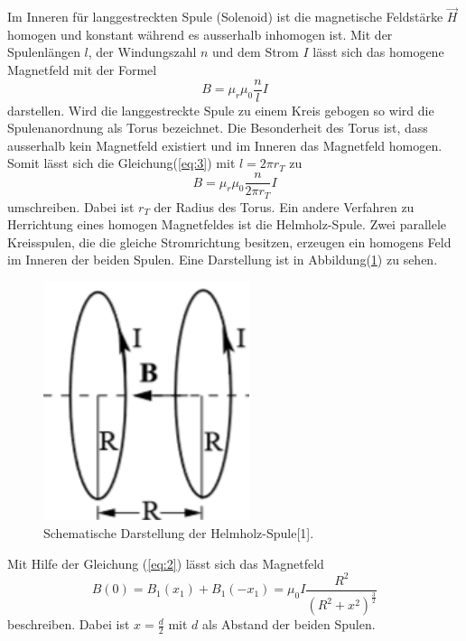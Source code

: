 Im Inneren für langgestreckten Spule (Solenoid) ist die magnetische Feldstärke $\vec{H}$
homogen und konstant während es ausserhalb inhomogen ist.
Mit der Spulenlängen $l$, der Windungszahl $n$ und dem Strom $I$ lässt sich das
homogene Magnetfeld mit der Formel
\begin{equation}
  B = \mu_r \mu_0 \frac{n}{l} I
  \label{eq:3}
\end{equation}
darstellen. Wird die langgestreckte Spule zu einem Kreis gebogen so wird die Spulenanordnung
als Torus bezeichnet. Die Besonderheit des Torus ist, dass ausserhalb kein Magnetfeld
existiert und im Inneren das Magnetfeld homogen. Somit lässt sich die Gleichung(\ref{eq:3})
mit $l= 2\pi r_T$ zu
\begin{equation}
  B = \mu_r \mu_0 \frac{n}{2\pi r_T} I
  \label{eq:4}
\end{equation}
umschreiben. Dabei ist $r_T$ der Radius des Torus.
Ein andere Verfahren zu Herrichtung eines homogen Magnetfeldes ist die Helmholz-Spule.
Zwei parallele Kreisspulen, die die gleiche Stromrichtung besitzen, erzeugen ein homogens
Feld im Inneren der beiden Spulen. Eine Darstellung ist in Abbildung(\ref{abb:2}) zu sehen.
\begin{figure}[H]
\includegraphics[width =10 cm, height = 7cm]{Abb2.png}
\caption{Schematische Darstellung der Helmholz-Spule[1].}
\label{abb:2}
\end{figure}
Mit Hilfe der Gleichung (\ref{eq:2}) lässt sich das Magnetfeld
\begin{equation}
  B(0)=B_1(x_1) + B_1(-x_1) = \mu_0 I \frac{R^2}{(R^2 + x^2)^{\frac{3}{2}}}
  \label{eq:5}
\end{equation}
beschreiben. Dabei ist $x=\frac{d}{2}$ mit $d$ als Abstand der beiden Spulen.
